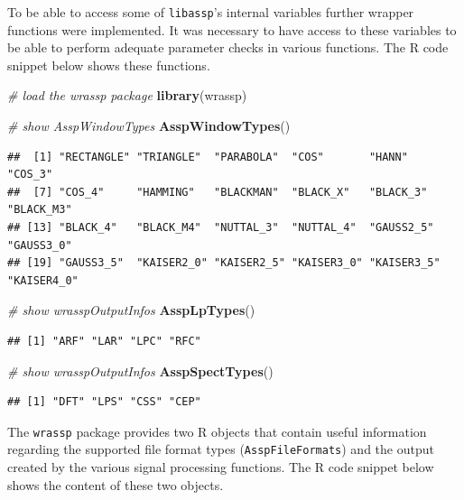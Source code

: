 \documentclass[]{book}
\newenvironment{Shaded}{\begin{snugshade}}{\end{snugshade}}
\newcommand{\CommentTok}[1]{\textcolor[rgb]{0.56,0.35,0.01}{\textit{#1}}}
\newcommand{\KeywordTok}[1]{\textcolor[rgb]{0.13,0.29,0.53}{\textbf{#1}}}
\newcommand{\NormalTok}[1]{#1}
\begin{document}
To be able to access some of \texttt{libassp}'s internal variables further wrapper functions were implemented. It was necessary to have access to these variables to be able to perform adequate parameter checks in various functions. The R code snippet below shows these functions.

\begin{Shaded}
\begin{Highlighting}[]
\CommentTok{# load the wrassp package}
\KeywordTok{library}\NormalTok{(wrassp)}

\CommentTok{# show AsspWindowTypes}
\KeywordTok{AsspWindowTypes}\NormalTok{()}
\end{Highlighting}
\end{Shaded}

\begin{verbatim}
##  [1] "RECTANGLE" "TRIANGLE"  "PARABOLA"  "COS"       "HANN"      "COS_3"    
##  [7] "COS_4"     "HAMMING"   "BLACKMAN"  "BLACK_X"   "BLACK_3"   "BLACK_M3" 
## [13] "BLACK_4"   "BLACK_M4"  "NUTTAL_3"  "NUTTAL_4"  "GAUSS2_5"  "GAUSS3_0" 
## [19] "GAUSS3_5"  "KAISER2_0" "KAISER2_5" "KAISER3_0" "KAISER3_5" "KAISER4_0"
\end{verbatim}

\begin{Shaded}
\begin{Highlighting}[]
\CommentTok{# show wrasspOutputInfos}
\KeywordTok{AsspLpTypes}\NormalTok{()}
\end{Highlighting}
\end{Shaded}

\begin{verbatim}
## [1] "ARF" "LAR" "LPC" "RFC"
\end{verbatim}

\begin{Shaded}
\begin{Highlighting}[]
\CommentTok{# show wrasspOutputInfos}
\KeywordTok{AsspSpectTypes}\NormalTok{()}
\end{Highlighting}
\end{Shaded}

\begin{verbatim}
## [1] "DFT" "LPS" "CSS" "CEP"
\end{verbatim}

The \texttt{wrassp} package provides two R objects that contain useful information regarding the supported file format types (\texttt{AsspFileFormats}) and the output created by the various signal processing functions. The R code snippet below shows the content of these two objects.
\end{document}
